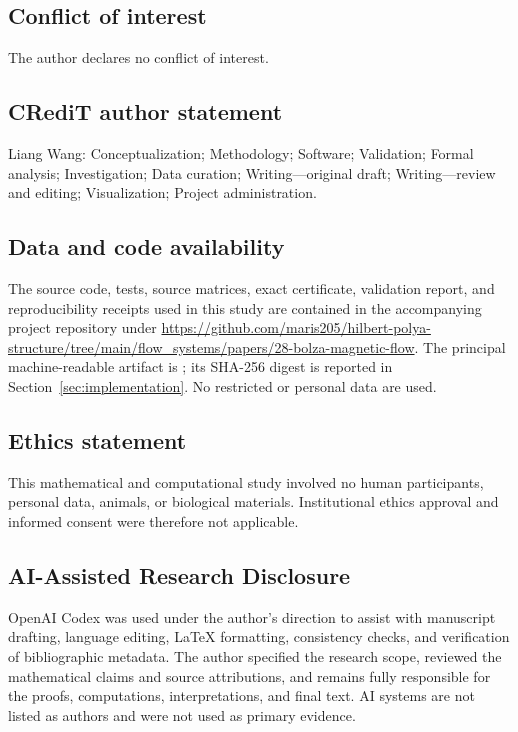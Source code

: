 \documentclass[11pt,a4paper]{article}
\theoremstyle{definition}
\begin{document}
\subsection*{Conflict of interest}
The author declares no conflict of interest.

\subsection*{CRediT author statement}
Liang Wang: Conceptualization; Methodology; Software; Validation; Formal
analysis; Investigation; Data curation; Writing---original draft;
Writing---review and editing; Visualization; Project administration.

\subsection*{Data and code availability}
The source code, tests, source matrices, exact certificate, validation report,
and reproducibility receipts used in this study are contained in the
accompanying project repository under
\url{https://github.com/maris205/hilbert-polya-structure/tree/main/flow_systems/papers/28-bolza-magnetic-flow}.
The principal machine-readable artifact is
; its SHA-256
digest is reported in Section~\ref{sec:implementation}.  No restricted or
personal data are used.

\subsection*{Ethics statement}
This mathematical and computational study involved no human participants,
personal data, animals, or biological materials.  Institutional ethics
approval and informed consent were therefore not applicable.

\subsection*{AI-Assisted Research Disclosure}
OpenAI Codex was used under the author's direction to assist with manuscript
drafting, language editing, \LaTeX{} formatting, consistency checks, and
verification of bibliographic metadata.  The author specified the research
scope, reviewed the mathematical claims and source attributions, and remains
fully responsible for the proofs, computations, interpretations, and final
text.  AI systems are not listed as authors and were not used as primary
evidence.



\end{document}
